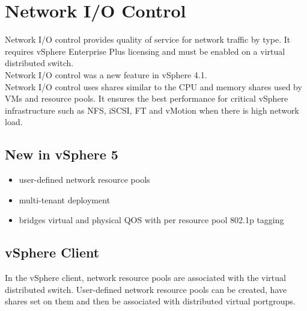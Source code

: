 \section{Network I/O Control}

Network I/O control provides quality of service for network traffic by type.
It requires vSphere Enterprise Plus licensing and must be enabled on a
virtual distributed switch.\\

Network I/O control was a new feature in vSphere 4.1.\\

Network I/O control uses shares similar to the CPU and memory shares used
by VMs and resource pools. It ensures the best performance for critical
vSphere infrastructure such as NFS, iSCSI, FT and vMotion when there is
high network load.

\subsection{New in vSphere 5}

\begin{itemize}
\item user-defined network resource pools
\item multi-tenant deployment
\item bridges virtual and physical QOS with per resource pool 802.1p tagging
\end{itemize}

\subsection{vSphere Client}

In the vSphere client, network resource pools are associated with the virtual
distributed switch. User-defined network resource pools can be created,
have shares set on them and then be associated with distributed virtual
portgroups.
